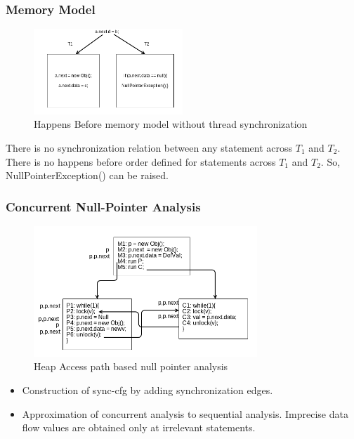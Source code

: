 \documentclass{beamer}
\begin{document}
\begin{frame}
\frametitle{Memory Model}
\begin{figure}[b]
	\centering
	\includegraphics[width=0.5\textwidth]{Figures/sync_no_lock.png}
	\caption{Happens Before memory model without thread synchronization}
	\label{fig:happensbefore2}
\end{figure}

 	There is no synchronization relation between any statement across $T_1$ and $T_2$. There is no happens before order defined for statements across $T_1$ and $T_2$. So, NullPointerException() can be raised.
	
\end{frame}

\begin{frame}
\frametitle{Concurrent Null-Pointer Analysis}
	\begin{figure}
	\centering
	\includegraphics[width=0.75\textwidth]{Figures/concurrent_analysis.png}
	\caption{Heap Access path based null pointer analysis}
	\label{fig:nullpointeranalysis}
	\end{figure}
	
	\begin{itemize}
		\item Construction of sync-cfg by adding synchronization edges.
		\item Approximation of concurrent analysis to sequential analysis. Imprecise data flow values are obtained only at irrelevant statements.
	\end{itemize}
	 	
\end{frame}
\end{document}
